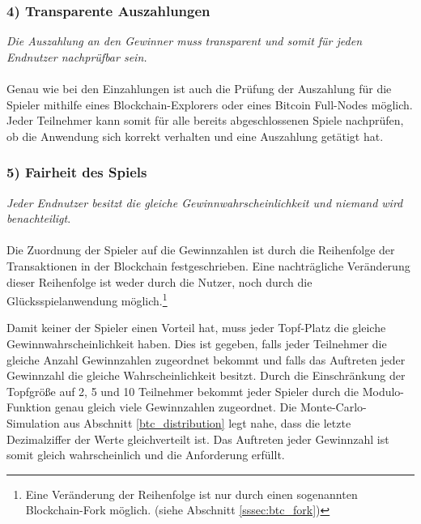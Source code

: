 \subsubsection{4) Transparente Auszahlungen}
\textit{Die Auszahlung an den Gewinner muss transparent und somit für jeden Endnutzer nachprüfbar sein.}\\\\
Genau wie bei den Einzahlungen ist auch die Prüfung der Auszahlung für die Spieler mithilfe eines Blockchain-Explorers oder eines Bitcoin Full-Nodes möglich. Jeder Teilnehmer kann somit für alle bereits abgeschlossenen Spiele nachprüfen, ob die Anwendung sich korrekt verhalten und eine Auszahlung getätigt hat. 
\subsubsection{5) Fairheit des Spiels}
\textit{Jeder Endnutzer besitzt die gleiche Gewinnwahrscheinlichkeit und niemand wird benachteiligt}.\\\\
Die Zuordnung der Spieler auf die Gewinnzahlen ist durch die Reihenfolge der Transaktionen in der Blockchain festgeschrieben. Eine nachträgliche Veränderung dieser Reihenfolge ist weder durch die Nutzer, noch durch die Glücksspielanwendung möglich.\footnote{Eine Veränderung der Reihenfolge ist nur durch einen sogenannten Blockchain-Fork möglich. (siehe Abschnitt \ref{sssec:btc_fork})}

Damit keiner der Spieler einen Vorteil hat, muss jeder Topf-Platz die gleiche Gewinnwahrscheinlichkeit haben.
Dies ist gegeben, falls jeder Teilnehmer die gleiche Anzahl Gewinnzahlen zugeordnet bekommt und falls das Auftreten jeder Gewinnzahl die gleiche Wahrscheinlichkeit besitzt. Durch die Einschränkung der Topfgröße auf 2, 5 und 10 Teilnehmer bekommt jeder Spieler durch die Modulo-Funktion genau gleich viele Gewinnzahlen zugeordnet. Die Monte-Carlo-Simulation aus Abschnitt \ref{btc_distribution} legt nahe, dass die letzte Dezimalziffer der Werte gleichverteilt ist. Das Auftreten jeder Gewinnzahl ist somit gleich wahrscheinlich und die Anforderung erfüllt.

